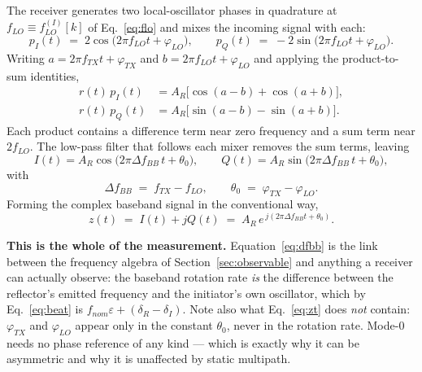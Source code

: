 \documentclass[11pt,a4paper]{article}
\begin{document}
The receiver generates two local-oscillator phases in quadrature at $f_{LO} \equiv f_{LO}^{(I)}[k]$
of Eq.~\eqref{eq:flo} and mixes the incoming signal with each:
\begin{equation}
p_I(t) \;=\; 2\cos\!\bigl(2\pi f_{LO} t + \varphi_{LO}\bigr),
\qquad
p_Q(t) \;=\; -2\sin\!\bigl(2\pi f_{LO} t + \varphi_{LO}\bigr).
\label{eq:lo}
\end{equation}
Writing $a = 2\pi f_{TX}t + \varphi_{TX}$ and $b = 2\pi f_{LO}t + \varphi_{LO}$ and applying the
product-to-sum identities,
\begin{align}
r(t)\,p_I(t) &= A_R\bigl[\cos(a-b) + \cos(a+b)\bigr], \label{eq:mixI}\\
r(t)\,p_Q(t) &= A_R\bigl[\sin(a-b) - \sin(a+b)\bigr]. \label{eq:mixQ}
\end{align}
Each product contains a difference term near zero frequency and a sum term near $2f_{LO}$. The
low-pass filter that follows each mixer removes the sum terms, leaving
\begin{equation}
I(t) = A_R\cos\!\bigl(2\pi \Delta f_{BB}\, t + \theta_0\bigr),
\qquad
Q(t) = A_R\sin\!\bigl(2\pi \Delta f_{BB}\, t + \theta_0\bigr),
\label{eq:IQ}
\end{equation}
with
\begin{equation}
\Delta f_{BB} \;=\; f_{TX} - f_{LO},
\qquad
\theta_0 \;=\; \varphi_{TX} - \varphi_{LO} .
\label{eq:dfbb}
\end{equation}
Forming the complex baseband signal in the conventional way,
\begin{equation}
z(t) \;=\; I(t) + jQ(t) \;=\; A_R\, e^{\,j(2\pi \Delta f_{BB} t + \theta_0)} .
\label{eq:zt}
\end{equation}

\begin{callout}
\textbf{This is the whole of the measurement.} Equation~\eqref{eq:dfbb} is the link between the
frequency algebra of Section~\ref{sec:observable} and anything a receiver can actually observe: the
baseband rotation rate \emph{is} the difference between the reflector's emitted frequency and the
initiator's own oscillator, which by Eq.~\eqref{eq:beat} is $f_{nom}\varepsilon + (\delta_R-\delta_I)$.
Note also what Eq.~\eqref{eq:zt} does \emph{not} contain: $\varphi_{TX}$ and $\varphi_{LO}$ appear
only in the constant $\theta_0$, never in the rotation rate. Mode-0 needs no phase reference of any
kind --- which is exactly why it can be asymmetric and why it is unaffected by static multipath.
\end{callout}
\end{document}
